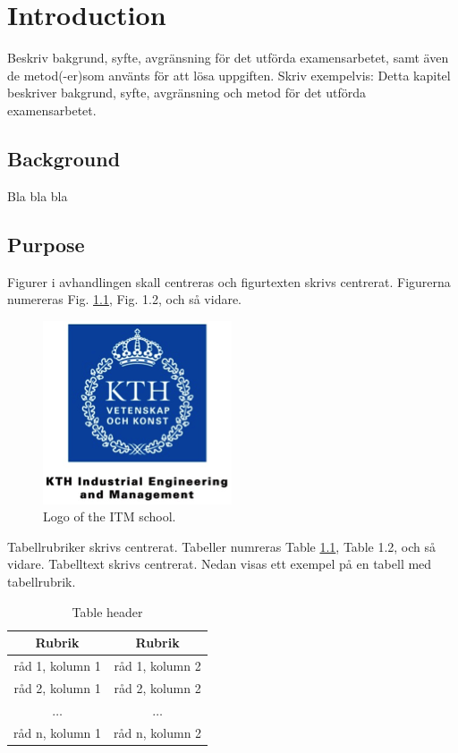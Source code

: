 \documentclass[a4paper,11pt]{kth-mag}
\begin{document}
\mainmatter
\pagestyle{newchap}

\chapter{Introduction}
Beskriv bakgrund, syfte, avgränsning för det utförda examensarbetet, samt även de  metod(-er)som använts för att lösa uppgiften. Skriv exempelvis: Detta kapitel beskriver bakgrund, syfte, avgränsning och metod för det utförda examensarbetet.

\section{Background}
Bla bla bla

\section{Purpose}
Figurer i avhandlingen skall centreras och figurtexten skrivs centrerat. Figurerna numereras Fig. \ref{fig:kth_logo}, Fig. 1.2, och så vidare. 
\begin{figure}[htbp]
\begin{center}
\includegraphics{KTH_ITM_logo}
\caption{Logo of the ITM school.}
\label{fig:kth_logo}
\end{center}
\end{figure}

\noindent{}Tabellrubriker skrivs centrerat. Tabeller numreras Table \ref{tab:defaulttable}, Table 1.2, och så vidare. Tabelltext skrivs centrerat. Nedan visas ett exempel på en tabell med tabellrubrik.
\begin{table}[htdp]
\caption{Table header}
\begin{center}
\begin{tabular}{cc}
\toprule
Rubrik & Rubrik \\
\midrule
råd 1, kolumn 1 & råd 1, kolumn 2 \\
råd 2, kolumn 1 & råd 2, kolumn 2 \\
$\ldots$	       & $\ldots$ \\
råd n, kolumn 1 & råd n, kolumn 2 \\
\bottomrule
\end{tabular}
\end{center}
\label{tab:defaulttable}
\end{table}%
\end{document}
